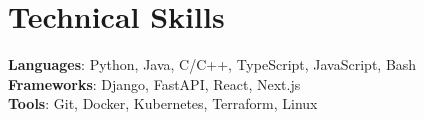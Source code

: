 
\section{Technical Skills}
\begin{itemize}[leftmargin=0.15in, label={}]
    \small{\item{
              \textbf{Languages}: Python, Java, C/C++, TypeScript, JavaScript, Bash \\
              \textbf{Frameworks}: Django, FastAPI, React, Next.js \\
              \textbf{Tools}: Git, Docker, Kubernetes, Terraform, Linux
          }}
\end{itemize}
